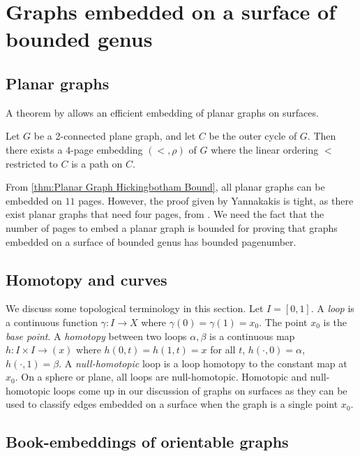 
\section{Graphs embedded on a surface of bounded genus}\label{sec:pagenumber_bounded_genus}

\subsection{Planar graphs}\label{ssec:Planar_Graphs}
A theorem by \textcite{yannakakisEmbeddingPlanarGraphs1989} allows an efficient embedding of planar graphs on surfaces.
\begin{theorem}\label{thm:4Pages_Planar}
	Let $G$ be a 2-connected plane graph, and let $C$ be the outer cycle of $G$. Then there exists a $4$-page embedding $(<, \rho)$ of $G$ where the linear ordering $<$ restricted to $C$ is a path on $C$. 
\end{theorem}

From \cref{thm:Planar Graph Hickingbotham Bound}, all planar graphs can be embedded on $11$ pages. However, the proof given by Yannakakis is tight, as there exist planar graphs that need four pages, from \textcite{yannakakisPlanarGraphsThat2020, kaufmannFourPagesAre2020}. We need the fact that the number of pages to embed a planar graph is bounded for proving that graphs embedded on a surface of bounded genus has bounded pagenumber.

\subsection{Homotopy and curves}

We discuss some topological terminology in this section. Let $I = [0, 1]$.
A \textit{loop} is a continuous function $\gamma : I \rightarrow X$ where $\gamma(0) = \gamma(1) = x_0$. The point $x_0$ is the \textit{base point}. A \textit{homotopy} between two loops $\alpha, \beta$ is a continuous map $h : I \times I \rightarrow (x)$ where $h(0, t) = h(1, t) = x$ for all $t$, $h(\cdot, 0) = \alpha$, $h(\cdot, 1) = \beta$. A \textit{null-homotopic} loop is a loop homotopy to the constant map at $x_0$. On a sphere or plane, all loops are null-homotopic. Homotopic and null-homotopic loops come up in our discussion of graphs on surfaces as they can be used to classify edges embedded on a surface when the graph is a single point $x_0$. 

\subsection{Book-embeddings of orientable graphs}

